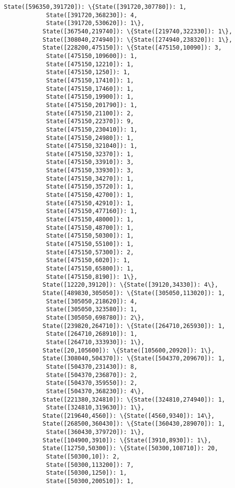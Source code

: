 \documentclass[11pt]{article}
\begin{document}
\begin{Verbatim}[commandchars=\\\{\}]
           State([596350,391720]): \{State([391720,307780]): 1,
            State([391720,368230]): 4,
            State([391720,530620]): 1\},
           State([367540,219740]): \{State([219740,322330]): 1\},
           State([308040,274940]): \{State([274940,238320]): 1\},
           State([228200,475150]): \{State([475150,10090]): 3,
            State([475150,109600]): 1,
            State([475150,12210]): 1,
            State([475150,1250]): 1,
            State([475150,17410]): 1,
            State([475150,17460]): 1,
            State([475150,19900]): 1,
            State([475150,201790]): 1,
            State([475150,21100]): 2,
            State([475150,22370]): 9,
            State([475150,230410]): 1,
            State([475150,24980]): 1,
            State([475150,321040]): 1,
            State([475150,32370]): 1,
            State([475150,33910]): 3,
            State([475150,33930]): 3,
            State([475150,34270]): 1,
            State([475150,35720]): 1,
            State([475150,42700]): 1,
            State([475150,42910]): 1,
            State([475150,477160]): 1,
            State([475150,48000]): 1,
            State([475150,48700]): 1,
            State([475150,50300]): 1,
            State([475150,55100]): 1,
            State([475150,57300]): 2,
            State([475150,6020]): 1,
            State([475150,65800]): 1,
            State([475150,8190]): 1\},
           State([12220,39120]): \{State([39120,34330]): 4\},
           State([489830,305050]): \{State([305050,113020]): 1,
            State([305050,218620]): 4,
            State([305050,323580]): 1,
            State([305050,698780]): 2\},
           State([239820,264710]): \{State([264710,265930]): 1,
            State([264710,268910]): 1,
            State([264710,333930]): 1\},
           State([20,105600]): \{State([105600,20920]): 1\},
           State([308040,504370]): \{State([504370,209670]): 1,
            State([504370,231430]): 8,
            State([504370,236870]): 2,
            State([504370,359550]): 2,
            State([504370,368230]): 4\},
           State([221380,324810]): \{State([324810,274940]): 1,
            State([324810,319630]): 1\},
           State([219640,4560]): \{State([4560,9340]): 14\},
           State([268500,360430]): \{State([360430,289070]): 1,
            State([360430,379720]): 1\},
           State([104900,3910]): \{State([3910,8930]): 1\},
           State([12750,50300]): \{State([50300,108710]): 20,
            State([50300,10]): 2,
            State([50300,113200]): 7,
            State([50300,1250]): 1,
            State([50300,200510]): 1,

\end{Verbatim}
\end{document}
